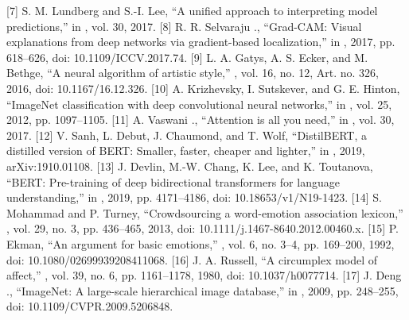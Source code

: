 \documentclass[conference]{IEEEtran}
\begin{document}
{}[7] S. M. Lundberg and S.-I. Lee, “A unified approach to interpreting model predictions,” in , vol. 30, 2017.\markdownRendererParagraphSeparator
{}[8] R. R. Selvaraju ., “Grad-CAM: Visual explanations from deep networks via gradient-based localization,” in , 2017, pp. 618–626, doi: 10.1109/ICCV.2017.74.\markdownRendererParagraphSeparator
{}[9] L. A. Gatys, A. S. Ecker, and M. Bethge, “A neural algorithm of artistic style,” , vol. 16, no. 12, Art. no. 326, 2016, doi: 10.1167/16.12.326.\markdownRendererParagraphSeparator
{}[10] A. Krizhevsky, I. Sutskever, and G. E. Hinton, “ImageNet classification with deep convolutional neural networks,” in , vol. 25, 2012, pp. 1097–1105.\markdownRendererParagraphSeparator
{}[11] A. Vaswani ., “Attention is all you need,” in , vol. 30, 2017.\markdownRendererParagraphSeparator
{}[12] V. Sanh, L. Debut, J. Chaumond, and T. Wolf, “DistilBERT, a distilled version of BERT: Smaller, faster, cheaper and lighter,” in , 2019, arXiv:1910.01108.\markdownRendererParagraphSeparator
{}[13] J. Devlin, M.-W. Chang, K. Lee, and K. Toutanova, “BERT: Pre-training of deep bidirectional transformers for language understanding,” in , 2019, pp. 4171–4186, doi: 10.18653/v1/N19-1423.\markdownRendererParagraphSeparator
{}[14] S. Mohammad and P. Turney, “Crowdsourcing a word-emotion association lexicon,” , vol. 29, no. 3, pp. 436–465, 2013, doi: 10.1111/j.1467-8640.2012.00460.x.\markdownRendererParagraphSeparator
{}[15] P. Ekman, “An argument for basic emotions,” , vol. 6, no. 3–4, pp. 169–200, 1992, doi: 10.1080/02699939208411068.\markdownRendererParagraphSeparator
{}[16] J. A. Russell, “A circumplex model of affect,” , vol. 39, no. 6, pp. 1161–1178, 1980, doi: 10.1037/h0077714.\markdownRendererParagraphSeparator
{}[17] J. Deng ., “ImageNet: A large-scale hierarchical image database,” in , 2009, pp. 248–255, doi: 10.1109/CVPR.2009.5206848.\markdownRendererParagraphSeparator
\end{document}
